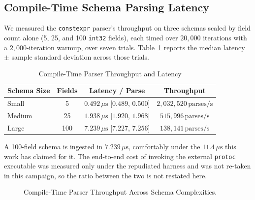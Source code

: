\subsection{Compile-Time Schema Parsing Latency}
We measured the \texttt{constexpr} parser's throughput on three schemas scaled by field count alone (5, 25, and 100 \texttt{int32} fields), each timed over $20{,}000$ iterations with a $2{,}000$-iteration warmup, over seven trials. Table~\ref{tab:compile_time_results} reports the median latency $\pm$ sample standard deviation across those trials.

\begin{table}[ht]
\centering
\caption{Compile-Time Parser Throughput and Latency}
\label{tab:compile_time_results}
\renewcommand{\arraystretch}{1.2}
\begin{tabular}{|l|c|c|c|}
\hline
\textbf{Schema Size} & \textbf{Fields} & \textbf{Latency / Parse} & \textbf{Throughput} \\ \hline
Small & 5 & $0.492\,\mu\text{s}$ [$0.489$, $0.500$] & $2{,}032{,}520\,\text{parses/s}$ \\ \hline
Medium & 25 & $1.938\,\mu\text{s}$ [$1.920$, $1.968$] & $515{,}996\,\text{parses/s}$ \\ \hline
Large & 100 & $7.239\,\mu\text{s}$ [$7.227$, $7.256$] & $138{,}141\,\text{parses/s}$ \\ \hline
\end{tabular}
\end{table}

A 100-field schema is ingested in $7.239\,\mu\text{s}$, comfortably under the $11.4\,\mu\text{s}$ this work has claimed for it. The end-to-end cost of invoking the external \texttt{protoc} executable was measured only under the repudiated harness and was not re-taken in this campaign, so the ratio between the two is not restated here.

\begin{figure}[ht]
\centering
{}
\caption{Compile-Time Parser Throughput Across Schema Complexities.}
\label{fig:parser_throughput}
\end{figure}

